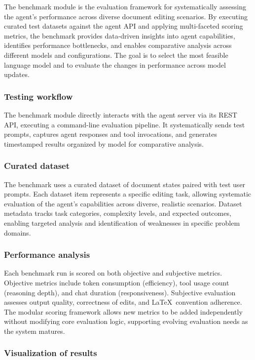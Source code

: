 The benchmark module is the evaluation framework for systematically assessing the agent's performance across diverse document editing scenarios.
By executing curated test datasets against the agent API and applying multi-faceted scoring metrics, the benchmark provides data-driven insights into agent capabilities, identifies performance bottlenecks, and enables comparative analysis across different models and configurations.
The goal is to select the most feasible language model and to evaluate the changes in performance across model updates.

\subsubsection{Testing workflow}

The benchmark module directly interacts with the agent server via its REST API, executing a command-line evaluation pipeline.
It systematically sends test prompts, captures agent responses and tool invocations, and generates timestamped results organized by model for comparative analysis.

\subsubsection{Curated dataset}

The benchmark uses a curated dataset of document states paired with test user prompts. 
Each dataset item represents a specific editing task, allowing systematic evaluation of the agent's capabilities across diverse, realistic scenarios.
Dataset metadata tracks task categories, complexity levels, and expected outcomes, enabling targeted analysis and identification of weaknesses in specific problem domains.

\subsubsection{Performance analysis}

Each benchmark run is scored on both objective and subjective metrics.
Objective metrics include token consumption (efficiency), tool usage count (reasoning depth), and chat duration (responsiveness).
Subjective evaluation assesses output quality, correctness of edits, and \LaTeX\ convention adherence.
The modular scoring framework allows new metrics to be added independently without modifying core evaluation logic, supporting evolving evaluation needs as the system matures.

\subsubsection{Visualization of results}

